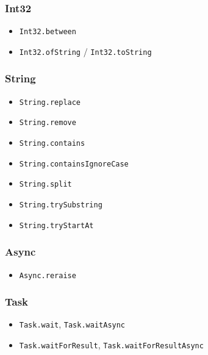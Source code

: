 \documentclass{article}
\begin{document}
\subsubsection{Int32}

\begin{itemize}
\item \texttt{Int32.between}
\item \texttt{Int32.ofString} / \texttt{Int32.toString}
\end{itemize}

\subsubsection{String}

\begin{itemize}
\item \texttt{String.replace}
\item \texttt{String.remove}
\item \texttt{String.contains}
\item \texttt{String.containsIgnoreCase}
\item \texttt{String.split}
\item \texttt{String.trySubstring}
\item \texttt{String.tryStartAt}
\end{itemize}

\subsubsection{Async}

\begin{itemize}
\item \texttt{Async.reraise}
\end{itemize}

\subsubsection{Task}

\begin{itemize}
\item \texttt{Task.wait}, \texttt{Task.waitAsync}
\item \texttt{Task.waitForResult}, \texttt{Task.waitForResultAsync}
\end{itemize}
\end{document}
